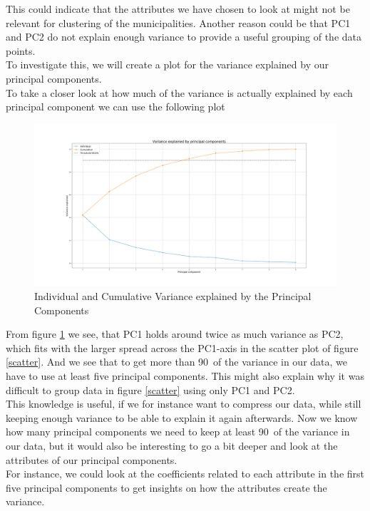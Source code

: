 \documentclass[11pt,fleqn]{article}
\numberwithin{footnote}{section}
\numberwithin{figure}{section}
\numberwithin{table}{section}
\begin{document}
This could indicate that the attributes we have chosen to look at might not be relevant for clustering of the municipalities. Another reason could be that PC1 and PC2 do not explain enough variance to provide a useful grouping of the data points.\\
To investigate this, we will create a plot for the variance explained by our principal components.
\\
To take a closer look at how much of the variance is actually explained by each principal component we can use the following plot
\begin{figure}[H]
	\centering
	\includegraphics[width=\textwidth]{variance_explained}
	\caption{Individual and Cumulative Variance explained by the Principal Components}
	\label{var_explain}
\end{figure}\noindent
From figure \ref{var_explain} we see, that PC1 holds around twice as much variance as PC2, which fits with the larger spread across the PC1-axis in the scatter plot of figure \ref{scatter}.
And we see that to get more than 90\pro\ of the variance in our data, we have to use at least five principal components. This might also explain why it was difficult to group data in figure \ref{scatter} using only PC1 and PC2.
\\
This knowledge is useful, if we for instance want to compress our data, while still keeping enough variance to be able to explain it again afterwards.
Now we know how many principal components we need to keep at least 90\pro\ of the variance in our data, but it would also be interesting to go a bit deeper and look at the attributes of our principal components.
\\
For instance, we could look at the coefficients related to each attribute in the first five principal components to get insights on how the attributes create the variance.
\\
\end{document}
